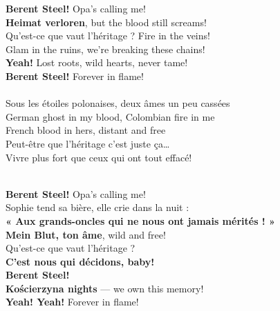 \begin{lyrics}
\textbf{Berent Steel!} Opa’s calling me!\\
\textbf{Heimat verloren}, but the blood still screams!\\
Qu’est-ce que vaut l’héritage ? Fire in the veins!\\
Glam in the ruins, we’re breaking these chains!\\
\textbf{Yeah!} Lost roots, wild hearts, never tame!\\
\textbf{Berent Steel!} Forever in flame!\\

\\
Sous les étoiles polonaises, deux âmes un peu cassées\\
German ghost in my blood, Colombian fire in me\\
French blood in hers, distant and free\\
Peut-être que l’héritage c’est juste ça…\\
Vivre plus fort que ceux qui ont tout effacé!\\


\\
\textbf{Berent Steel!} Opa’s calling me!\\
Sophie tend sa bière, elle crie dans la nuit :\\
\textbf{« Aux grands-oncles qui ne nous ont jamais mérités ! »}\\

\textbf{Mein Blut, ton âme}, wild and free!\\
Qu’est-ce que vaut l’héritage ?\\
\textbf{C’est nous qui décidons, baby!}\\

\textbf{Berent Steel!}\\
\textbf{Kościerzyna nights} — we own this memory!\\
\textbf{Yeah! Yeah!} Forever in flame!\\

\end{lyrics}

